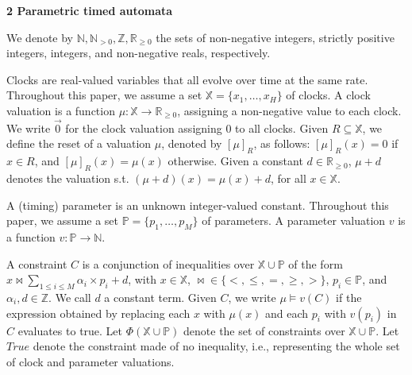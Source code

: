 \documentclass[10pt,a4paper]{article}
\begin{document}
 
\par\medskip\noindent\textbf{2 Parametric timed automata}\par
 
 
We denote by $\mathbb{N},\mathbb{N}_{>0},\mathbb{Z},\mathbb{R}_{\geq 0}$ the sets of non-negative integers, strictly positive integers, integers, and non-negative reals, respectively.\par
 
 
 
Clocks are real-valued variables that all evolve over time at the same rate. Throughout this paper, we assume a set $\mathbb{X}=\{x_{1},\dots,x_{H}\}$ of clocks. A clock valuation is a function $\mu:\mathbb{X}\to\mathbb{R}_{\geq 0}$, assigning a non-negative value to each clock. We write $\vec{0}$ for the clock valuation assigning $0$ to all clocks. Given $R\subseteq\mathbb{X}$, we define the reset of a valuation $\mu$, denoted by $[\mu]_{R}$, as follows: $[\mu]_{R}(x)=0$ if $x\in R$, and $[\mu]_{R}(x)=\mu(x)$ otherwise. Given a constant $d\in\mathbb{R}_{\geq 0}$, $\mu+d$ denotes the valuation s.t. $(\mu+d)(x)=\mu(x)+d$, for all $x\in\mathbb{X}$.\par
 
 
 
A (timing) parameter is an unknown integer-valued constant. Throughout this paper, we assume a set $\mathbb{P}=\{p_{1},\dots,p_{M}\}$ of parameters. A parameter valuation $v$ is a function $v:\mathbb{P}\to\mathbb{N}$.\par
 
 
 
A constraint $C$ is a conjunction of inequalities over $\mathbb{X}\cup\mathbb{P}$ of the form $x\bowtie\sum_{1\leq i\leq M}\alpha_{i}\times p_{i}+d$, with $x\in\mathbb{X}$, ${\bowtie}\in\{<,\leq,=,\geq,>\}$, $p_{i}\in\mathbb{P}$, and $\alpha_{i},d\in\mathbb{Z}$. We call $d$ a constant term. Given $C$, we write $\mu\models v(C)$ if the expression obtained by replacing each $x$ with $\mu(x)$ and each $p_{i}$ with $v(p_{i})$ in $C$ evaluates to true. Let $\Phi(\mathbb{X}\cup\mathbb{P})$ denote the set of constraints over $\mathbb{X}\cup\mathbb{P}$. Let $\mathit{True}$ denote the constraint made of no inequality, i.e., representing the whole set of clock and parameter valuations.\par
 
\end{document}
